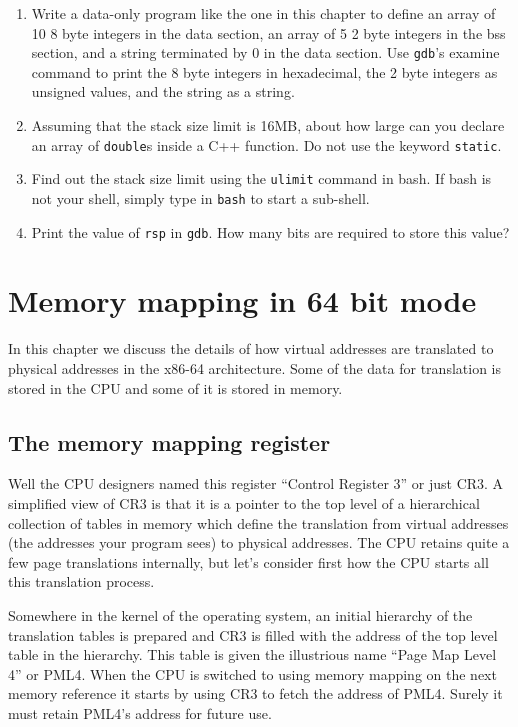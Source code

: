 \documentclass[11pt,b5paper]{book}
\begin{document}
\begin{enumerate}
 \item Write a data-only program like the one in this chapter to define an array of 10 8 byte integers
 in the data section, an array of 5 2 byte integers in the bss section, and a string terminated by 0 in the 
 data section.
 Use {\tt gdb}'s examine command to print the 8 byte integers in hexadecimal, the 2 byte integers as unsigned
 values, and the string as a string.
 \item Assuming that the stack size limit is 16MB, about how large can you declare an array of {\tt double}s inside
 a C++ function.  Do not use the keyword {\tt static}.
 \item Find out the stack size limit using the {\tt ulimit} command in bash.  If bash is not your shell, simply
 type in {\tt bash} to start a sub-shell.
 \item Print the value of {\tt rsp} in {\tt gdb}.  How many bits are required to store this value?
\end{enumerate}

\chapter{Memory mapping in 64 bit mode}

In this chapter we discuss the details of how virtual addresses are translated to
physical addresses in the x86-64 architecture. 
Some of the data for translation is stored in the CPU and some of it is stored
in memory.

\section{The memory mapping register}

Well the CPU designers named this register ``Control Register 3'' or just CR3.
A simplified view of CR3 is that it is a pointer to the top level of a hierarchical collection of tables in memory which define the translation 
from virtual addresses (the addresses your program sees) to physical addresses.
The CPU retains quite a few page translations internally, but let's consider
first how the CPU starts all this translation process.

Somewhere in the kernel of the operating system, an initial hierarchy of the
translation tables is prepared and CR3 is filled with the address of the
top level table in the hierarchy.
This table is given the illustrious name ``Page Map Level 4'' or PML4. 
When the CPU is switched to using memory mapping on the next memory reference it
starts by using CR3 to fetch the address of PML4.
Surely it must retain PML4's address for future use.
\end{document}
